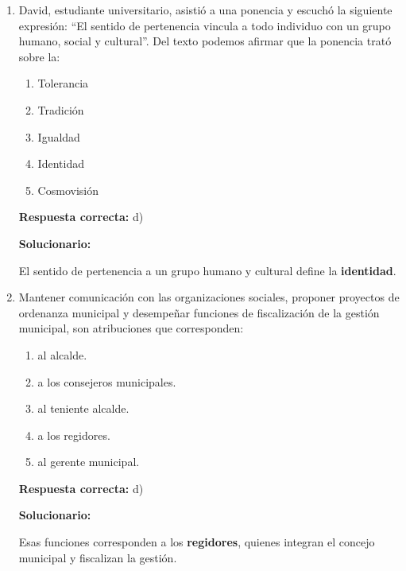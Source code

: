 \begin{enumerate}[resume]

	
	\item David, estudiante universitario, asistió a una ponencia y escuchó la siguiente expresión: ``El sentido de pertenencia vincula a todo individuo con un grupo humano, social y cultural''. Del texto podemos afirmar que la ponencia trató sobre la:
	\begin{enumerate}[label=\alph*)]
		\item Tolerancia
		\item Tradición
		\item Igualdad
		\item Identidad
		\item Cosmovisión
	\end{enumerate}
	\textbf{Respuesta correcta:} d)
	
	\vspace{2mm}
	\textbf{Solucionario:}
	
	El sentido de pertenencia a un grupo humano y cultural define la \textbf{identidad}.
	

	
	\vspace{6mm}
	
	\item Mantener comunicación con las organizaciones sociales, proponer proyectos de ordenanza municipal y desempeñar funciones de fiscalización de la gestión municipal, son atribuciones que corresponden:
	\begin{enumerate}[label=\alph*)]
		\item al alcalde.
		\item a los consejeros municipales.
		\item al teniente alcalde.
		\item a los regidores.
		\item al gerente municipal.
	\end{enumerate}
	\textbf{Respuesta correcta:} d)
	
	\vspace{2mm}
	\textbf{Solucionario:}
	
	Esas funciones corresponden a los \textbf{regidores}, quienes integran el concejo municipal y fiscalizan la gestión.
	

	
	\vspace{6mm}
	

\end{enumerate}
